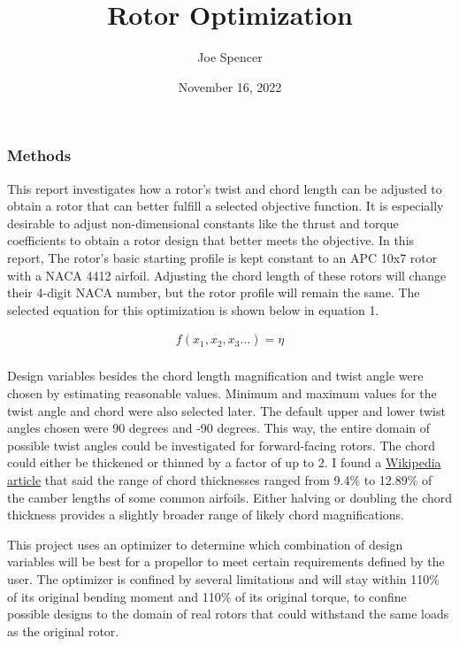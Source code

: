 \documentclass{article}
\begin{document}
\author{Joe Spencer}
\title{Rotor Optimization}
\date{November 16, 2022}
\maketitle

\subsubsection*{Methods}

This report investigates how a rotor's twist and chord length can be adjusted to obtain a rotor that can better fulfill a selected objective function. It is especially desirable to adjust non-dimensional constants like the thrust and torque coefficients to obtain a rotor design that better meets the objective. In this report, The rotor's basic starting profile is kept constant to an APC 10x7 rotor with a NACA 4412 airfoil. Adjusting the chord length of these rotors will change their 4-digit NACA number, but the rotor profile will remain the same. The selected equation for this optimization is shown below in equation 1. \newline

\begin{equation}
\begin{aligned}
	f(x_{1}, x_{2}, x_{3}...) = \eta \\
\end{aligned}
\end{equation} \newline

\noindent Design variables besides the chord length magnification and twist angle were chosen by estimating reasonable values. Minimum and maximum values for the twist angle and chord were also selected later. The default upper and lower twist angles chosen were 90 degrees and -90 degrees. This way, the entire domain of possible twist angles could be investigated for forward-facing rotors. The chord could either be thickened or thinned by a factor of up to 2. I found a \href{https://en.wikipedia.org/wiki/Thickness-to-chord_ratio}{Wikipedia article} that said the range of chord thicknesses ranged from 9.4\% to 12.89\% of the camber lengths of some common airfoils. Either halving or doubling the chord thickness provides a slightly broader range of likely chord magnifications. \newline

\noindent This project uses an optimizer to determine which combination of design variables will be best for a propellor to meet certain requirements defined by the user. The optimizer is confined by several limitations and will stay within 110\% of its original bending moment and 110\% of its original torque, to confine possible designs to the domain of real rotors that could withstand the same loads as the original rotor. \newline
\end{document}
